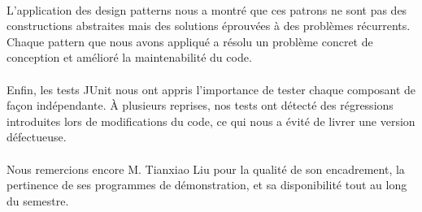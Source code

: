 \paragraph{} L'application des design patterns nous a montré que ces patrons ne sont pas des constructions abstraites mais des solutions éprouvées à des problèmes récurrents. Chaque pattern que nous avons appliqué a résolu un problème concret de conception et amélioré la maintenabilité du code.

\paragraph{} Enfin, les tests JUnit nous ont appris l'importance de tester chaque composant de façon indépendante. À plusieurs reprises, nos tests ont détecté des régressions introduites lors de modifications du code, ce qui nous a évité de livrer une version défectueuse.

\paragraph{} Nous remercions encore M. Tianxiao Liu pour la qualité de son encadrement, la pertinence de ses programmes de démonstration, et sa disponibilité tout au long du semestre.
